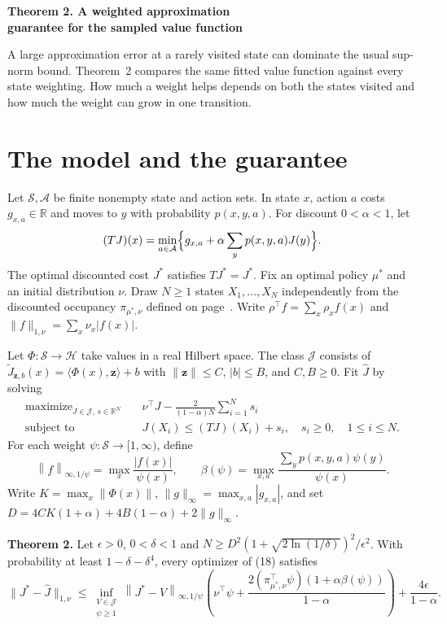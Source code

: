 \documentclass[12pt,a4paper]{article}
\newcommand{\R}{\mathbb R}
\newcommand{\piopt}{\pi_{\mu^*,\nu}}
\newcommand{\class}{\mathcal J}
\newcommand{\wn}[1]{\left\|#1\right\|_{\infty,1/\psi}}
\begin{document}
{\LARGE\bfseries Theorem 2. A weighted approximation\\[2pt] guarantee for the sampled value function\par}
\medskip
A large approximation error at a rarely visited state can dominate the usual
sup-norm bound. Theorem~2 compares the same fitted value function against
every state weighting. How much a weight helps depends on both the states
visited and how much the weight can grow in one transition.

\section*{The model and the guarantee}
Let \(\mathcal S,\mathcal A\) be finite nonempty state and action sets.
In state \(x\), action \(a\) costs \(g_{x,a}\in\R\) and moves to \(y\) with
probability \(p(x,y,a)\). For discount \(0<\alpha<1\), let
\[
 (TJ)(x)=\min_{a\in\mathcal A}
       \Bigl\{g_{x,a}+\alpha\sum_y p(x,y,a)J(y)\Bigr\}.
\]
The optimal discounted cost \(J^*\) satisfies \(TJ^*=J^*\).
Fix an optimal policy \(\mu^*\) and an initial distribution \(\nu\).
Draw \(N\ge1\) states \(X_1,\ldots,X_N\) independently from the discounted
occupancy \(\piopt\) defined on page~\pageref{eq:occupancy}.
Write \(\rho^\top f=\sum_x\rho_x f(x)\) and
\(\|f\|_{1,\nu}=\sum_x\nu_x|f(x)|\).

Let \(\Phi:\mathcal S\to\mathcal H\) take values in a real Hilbert space.
The class \(\class\) consists of \(\widetilde J_{\mathbf z,b}(x)
=\langle\Phi(x),\mathbf z\rangle+b\) with \(\|\mathbf z\|\le C\), \(|b|\le B\),
and \(C,B\ge0\). Fit \(\widehat J\) by solving
\begin{equation}
 \begin{aligned}
  \operatorname{maximize}_{J\in\class,\,s\in\R^N}\quad&
      \nu^\top J-\frac{2}{(1-\alpha)N}\sum_{i=1}^N s_i\\
  \text{subject to}\quad& J(X_i)\le(TJ)(X_i)+s_i,\quad s_i\ge0,\quad 1\le i\le N .
 \end{aligned}
 \tag{18}
\end{equation}
For each weight \(\psi:\mathcal S\to[1,\infty)\), define
\[
 \wn{f}=\max_x\frac{|f(x)|}{\psi(x)},\qquad
 \beta(\psi)=\max_{x,a}\frac{\sum_y p(x,y,a)\psi(y)}{\psi(x)} .
\]
Write \(K=\max_x\|\Phi(x)\|\), \(\|g\|_\infty=\max_{x,a}|g_{x,a}|\),
and set \(D=4CK(1+\alpha)+4B(1-\alpha)+2\|g\|_\infty\).

\textbf{Theorem 2.} Let \(\epsilon>0\), \(0<\delta<1\) and
\(N\ge D^2(1+\sqrt{2\ln(1/\delta)})^2/\epsilon^2\).
With probability at least \(1-\delta-\delta^4\), every optimizer of (18) satisfies
\begin{equation}
 \|J^*-\widehat J\|_{1,\nu}
 \le \inf_{\substack{V\in\class\\ \psi\ge1}}\!
 \wn{J^*-V}
 \left(\nu^\top\psi+
 \frac{2(\piopt^\top\psi)(1+\alpha\beta(\psi))}{1-\alpha}\right)
 +\frac{4\epsilon}{1-\alpha}.
 \tag{25}\label{eq:theorem}
\end{equation}
\end{document}
